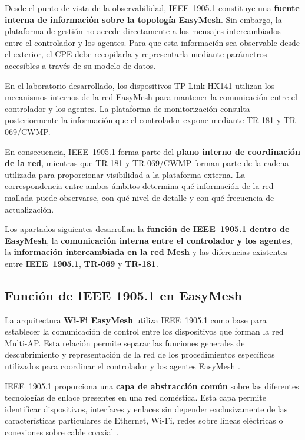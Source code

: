 Desde el punto de vista de la observabilidad, IEEE~1905.1 constituye una
\textbf{fuente interna de información sobre la topología EasyMesh}. Sin
embargo, la plataforma de gestión no accede directamente a los mensajes
intercambiados entre el controlador y los agentes. Para que esta
información sea observable desde el exterior, el CPE debe recopilarla y
representarla mediante parámetros accesibles a través de su modelo de
datos.

En el laboratorio desarrollado, los dispositivos TP-Link HX141 utilizan
los mecanismos internos de la red EasyMesh para mantener la comunicación
entre el controlador y los agentes. La plataforma de monitorización
consulta posteriormente la información que el controlador expone
mediante TR-181 y TR-069/CWMP.

En consecuencia, IEEE~1905.1 forma parte del
\textbf{plano interno de coordinación de la red}, mientras que TR-181 y
TR-069/CWMP forman parte de la cadena utilizada para proporcionar
visibilidad a la plataforma externa. La correspondencia entre ambos
ámbitos determina qué información de la red mallada puede observarse,
con qué nivel de detalle y con qué frecuencia de actualización.

Los apartados siguientes desarrollan la
\textbf{función de IEEE~1905.1 dentro de EasyMesh}, la
\textbf{comunicación interna entre el controlador y los agentes}, la
\textbf{información intercambiada en la red Mesh} y las diferencias
existentes entre \textbf{IEEE~1905.1}, \textbf{TR-069} y
\textbf{TR-181}.

\subsection{Función de IEEE 1905.1 en EasyMesh}
\label{subsec:funcion-ieee-1905-1-easymesh}

La arquitectura \textbf{Wi-Fi EasyMesh} utiliza IEEE~1905.1 como base
para establecer la comunicación de control entre los dispositivos que
forman la red Multi-AP. Esta relación permite separar las funciones
generales de descubrimiento y representación de la red de los
procedimientos específicos utilizados para coordinar el controlador y
los agentes EasyMesh
\cite{ieee_1905_1,wifi_alliance_easymesh}.

IEEE~1905.1 proporciona una \textbf{capa de abstracción común} sobre las
diferentes tecnologías de enlace presentes en una red doméstica. Esta
capa permite identificar dispositivos, interfaces y enlaces sin depender
exclusivamente de las características particulares de Ethernet, Wi-Fi,
redes sobre líneas eléctricas o conexiones sobre cable coaxial
\cite{ieee_1905_1}.

